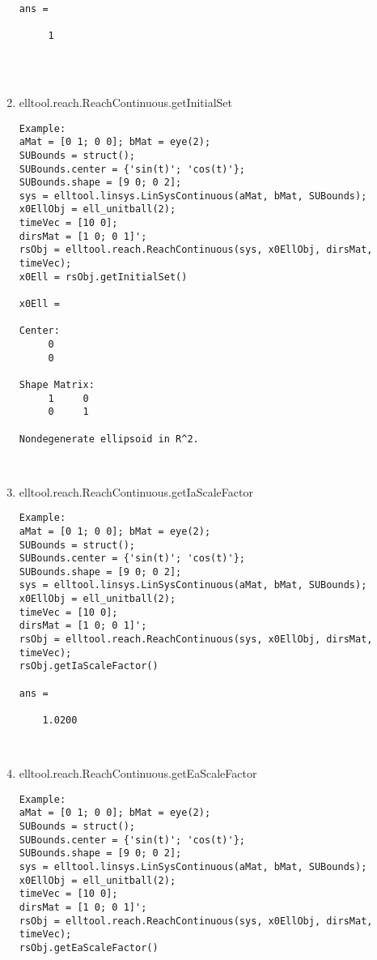 \begin{enumerate}
\begin{lstlisting}
ans =

     1




\end{lstlisting}
\fontfamily{\familydefault}
\selectfont
\item {elltool.reach.ReachContinuous.getInitialSet}
\selectfont
\begin{lstlisting}
Example:
aMat = [0 1; 0 0]; bMat = eye(2);
SUBounds = struct();
SUBounds.center = {'sin(t)'; 'cos(t)'};
SUBounds.shape = [9 0; 0 2];
sys = elltool.linsys.LinSysContinuous(aMat, bMat, SUBounds);
x0EllObj = ell_unitball(2);
timeVec = [10 0];
dirsMat = [1 0; 0 1]';
rsObj = elltool.reach.ReachContinuous(sys, x0EllObj, dirsMat, timeVec);
x0Ell = rsObj.getInitialSet()

x0Ell =

Center:
     0
     0

Shape Matrix:
     1     0
     0     1

Nondegenerate ellipsoid in R^2.



\end{lstlisting}
\fontfamily{\familydefault}
\selectfont
\item {elltool.reach.ReachContinuous.getIaScaleFactor}
\selectfont
\begin{lstlisting}
Example:
aMat = [0 1; 0 0]; bMat = eye(2);
SUBounds = struct();
SUBounds.center = {'sin(t)'; 'cos(t)'};
SUBounds.shape = [9 0; 0 2];
sys = elltool.linsys.LinSysContinuous(aMat, bMat, SUBounds);
x0EllObj = ell_unitball(2);
timeVec = [10 0];
dirsMat = [1 0; 0 1]';
rsObj = elltool.reach.ReachContinuous(sys, x0EllObj, dirsMat, timeVec);
rsObj.getIaScaleFactor()

ans =

    1.0200



\end{lstlisting}
\fontfamily{\familydefault}
\selectfont
\item {elltool.reach.ReachContinuous.getEaScaleFactor}
\selectfont
\begin{lstlisting}
Example:
aMat = [0 1; 0 0]; bMat = eye(2);
SUBounds = struct();
SUBounds.center = {'sin(t)'; 'cos(t)'};
SUBounds.shape = [9 0; 0 2];
sys = elltool.linsys.LinSysContinuous(aMat, bMat, SUBounds);
x0EllObj = ell_unitball(2);
timeVec = [10 0];
dirsMat = [1 0; 0 1]';
rsObj = elltool.reach.ReachContinuous(sys, x0EllObj, dirsMat, timeVec);
rsObj.getEaScaleFactor()


\end{lstlisting}
\end{enumerate}
